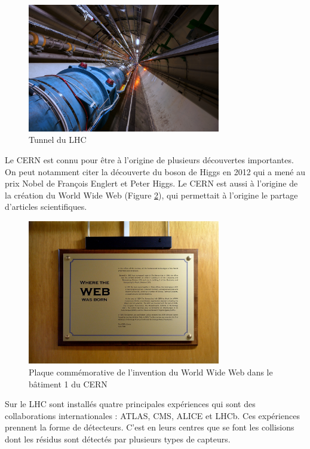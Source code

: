 \documentclass[a4paper,11pt]{report}
\begin{document}
\begin{figure}[!htb]
    \includegraphics[width=0.75\textwidth, center]{LHC.jpg}
    \caption{Tunnel du LHC}
    \label{LHC}
\end{figure}

Le CERN est connu pour être à l'origine de plusieurs découvertes importantes.
On peut notamment citer la découverte du boson de Higgs en 2012 qui a mené au prix Nobel de François Englert et Peter Higgs.
Le CERN est aussi à l'origine de la création du World Wide Web (Figure \ref{WEB}), qui permettait à l'origine le partage d'articles scientifiques.

\begin{figure}[!htb]
    \includegraphics[width=0.75\textwidth, center]{WEB.jpg}
    \caption{Plaque commémorative de l'invention du World Wide Web dans le bâtiment 1 du CERN}
    \label{WEB}
\end{figure}

Sur le LHC sont installés quatre principales expériences qui sont des collaborations internationales : ATLAS, CMS, ALICE et LHCb.
Ces expériences prennent la forme de détecteurs. C'est en leurs centres que se font les collisions dont les résidus sont détectés par plusieurs types de capteurs.
\end{document}
